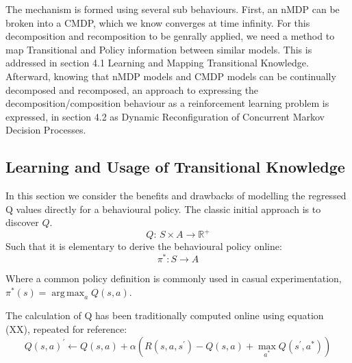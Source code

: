 \documentclass[compsoc,journal,letterpaper,10pt,draftclsnofoot,onecolumn]{IEEEtran}
\DeclareMathOperator*{\argmax}{arg\,max}
\begin{document}
The mechanism is formed using several sub behaviours. First, an nMDP can
be broken into a CMDP, which we know converges at time infinity. For
this decomposition and recomposition to be genrally applied, we need a
method to map Transitional and Policy information between similar
models. This is addressed in section 4.1 Learning and Mapping
Transitional Knowledge. Afterward, knowing that nMDP models and CMDP
models can be continually decomposed and recomposed, an approach to
expressing the decomposition/composition behaviour as a reinforcement
learning problem is expressed, in section 4.2 as Dynamic Reconfiguration
of Concurrent Markov Decision Processes.

\subsection{Learning and Usage of Transitional
Knowledge}\label{learning-and-usage-of-transitional-knowledge}

In this section we consider the benefits and drawbacks of modelling the
regressed Q values directly for a behavioural policy. The classic
initial approach is to discover \(Q\).
\begin{equation}
Q:\,S \times A \rightarrow \mathbb{R}^{+}
\end{equation}
Such that it is elementary to derive the behavioural policy online:
\begin{equation}
\pi^{*}:S \rightarrow A
\end{equation}

Where a common policy definition is commonly used in casual
experimentation, \(\pi^{*}(s) = \argmax_{a}Q(s,a)\).

The calculation of Q has been traditionally computed online using
equation (XX), repeated for reference:
\begin{equation}
{Q(s,a)}^{'} \leftarrow Q(s,a) + \alpha\left( R\left( s,a,s^{'} \right) - Q\left( s,a \right) + \max_{a^{*}}Q(s^{'},a^{*}) \right)
\end{equation}
\end{document}
